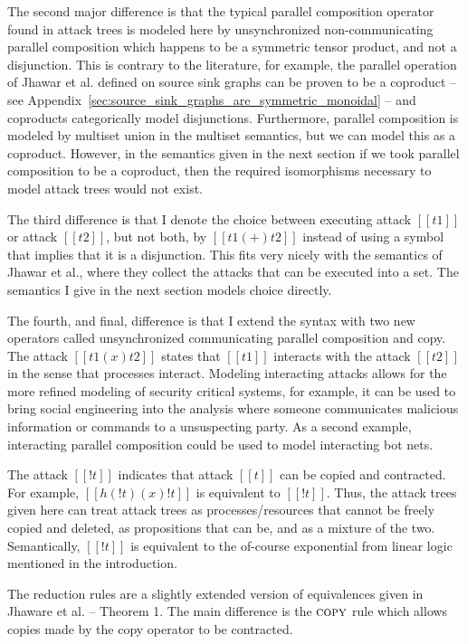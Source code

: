 \documentclass{sigplanconf}
\begin{document}
The second major difference is that the typical parallel composition
operator found in attack trees is modeled here by unsynchronized
non-communicating parallel composition which happens to be a symmetric
tensor product, and not a disjunction.  This is contrary to the
literature, for example, the parallel operation of Jhawar et
al. defined on source sink graphs \cite{Jhawar:2015} can be proven to
be a coproduct -- see
Appendix~\ref{sec:source_sink_graphs_are_symmetric_monoidal} -- and
coproducts categorically model disjunctions.  Furthermore, parallel
composition is modeled by multiset union in the multiset semantics,
but we can model this as a coproduct.  However, in the semantics given
in the next section if we took parallel composition to be a coproduct,
then the required isomorphisms necessary to model attack trees would
not exist.

The third difference is that I denote the choice between executing
attack $[[t1]]$ or attack $[[t2]]$, but not both, by $[[t1 (+) t2]]$
instead of using a symbol that implies that it is a disjunction.  This
fits very nicely with the semantics of Jhawar et al., where they
collect the attacks that can be executed into a set.  The semantics I
give in the next section models choice directly.

The fourth, and final, difference is that I extend the syntax with two
new operators called unsynchronized communicating parallel composition
and copy.  The attack $[[t1 (x) t2]]$ states that $[[t1]]$ interacts
with the attack $[[t2]]$ in the sense that processes interact.
Modeling interacting attacks allows for the more refined modeling of
security critical systems, for example, it can be used to bring social
engineering into the analysis where someone communicates malicious
information or commands to a unsuspecting party.  As a second example,
interacting parallel composition could be used to model interacting
bot nets.

The attack $[[! t]]$ indicates that attack $[[t]]$ can be copied and
contracted.  For example, $[[h(!t) (x) !t]]$ is equivalent to $[[!
    t]]$.  Thus, the attack trees given here can treat attack trees as
processes/resources that cannot be freely copied and deleted, as
propositions that can be, and as a mixture of the two.  Semantically,
$[[! t]]$ is equivalent to the of-course exponential from linear logic
mentioned in the introduction.

The reduction rules are a slightly extended version of equivalences
given in Jhaware et al. \cite{Jhawar:2015} -- Theorem 1.  The main
difference is the $\textsc{copy}$ rule which allows copies made by the
copy operator to be contracted.
\end{document}

